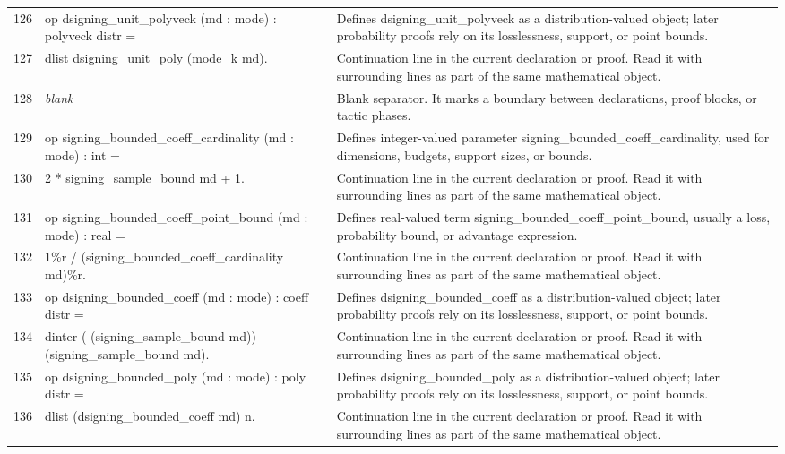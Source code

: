\documentclass[10pt]{article}
\begin{document}
\begin{longtable}{r L{0.53\textwidth} L{0.37\textwidth}}
126 & {\ttfamily\scriptsize op dsigning\_unit\_polyveck (md : mode) : polyveck distr =} & Defines dsigning\_unit\_polyveck as a distribution-valued object; later probability proofs rely on its losslessness, support, or point bounds. \\
127 & {\ttfamily\scriptsize   dlist dsigning\_unit\_poly (mode\_k md).} & Continuation line in the current declaration or proof.  Read it with surrounding lines as part of the same mathematical object. \\
128 & {\ttfamily\scriptsize \emph{blank}} & Blank separator.  It marks a boundary between declarations, proof blocks, or tactic phases. \\
129 & {\ttfamily\scriptsize op signing\_bounded\_coeff\_cardinality (md : mode) : int =} & Defines integer-valued parameter signing\_bounded\_coeff\_cardinality, used for dimensions, budgets, support sizes, or bounds. \\
130 & {\ttfamily\scriptsize   2 * signing\_sample\_bound md + 1.} & Continuation line in the current declaration or proof.  Read it with surrounding lines as part of the same mathematical object. \\
131 & {\ttfamily\scriptsize op signing\_bounded\_coeff\_point\_bound (md : mode) : real =} & Defines real-valued term signing\_bounded\_coeff\_point\_bound, usually a loss, probability bound, or advantage expression. \\
132 & {\ttfamily\scriptsize   1\%r / (signing\_bounded\_coeff\_cardinality md)\%r.} & Continuation line in the current declaration or proof.  Read it with surrounding lines as part of the same mathematical object. \\
133 & {\ttfamily\scriptsize op dsigning\_bounded\_coeff (md : mode) : coeff distr =} & Defines dsigning\_bounded\_coeff as a distribution-valued object; later probability proofs rely on its losslessness, support, or point bounds. \\
134 & {\ttfamily\scriptsize   dinter (-(signing\_sample\_bound md)) (signing\_sample\_bound md).} & Continuation line in the current declaration or proof.  Read it with surrounding lines as part of the same mathematical object. \\
135 & {\ttfamily\scriptsize op dsigning\_bounded\_poly (md : mode) : poly distr =} & Defines dsigning\_bounded\_poly as a distribution-valued object; later probability proofs rely on its losslessness, support, or point bounds. \\
136 & {\ttfamily\scriptsize   dlist (dsigning\_bounded\_coeff md) n.} & Continuation line in the current declaration or proof.  Read it with surrounding lines as part of the same mathematical object. \\

\end{longtable}
\end{document}
